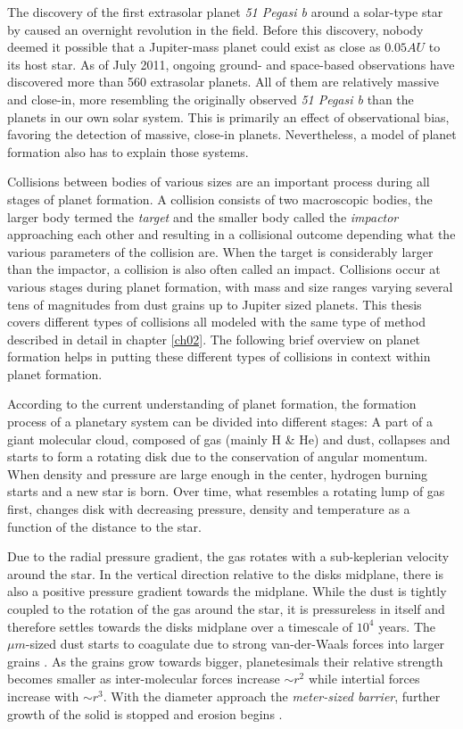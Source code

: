 The discovery of the first extrasolar planet \emph{51 Pegasi b} around a solar-type star by \cite{1995Natur.378..355M} caused an overnight revolution in the field. 
Before this discovery, nobody deemed it possible that a Jupiter-mass planet could exist as close as $0.05 AU$ to its host star. As of July 2011, ongoing ground- and space-based observations have discovered more than 560 extrasolar planets. All of them are relatively massive and close-in, more resembling the originally observed \emph{51 Pegasi b} than the planets in our own solar system. This is primarily an effect of observational bias, favoring the detection of massive, close-in planets. Nevertheless, a model of planet formation also has to explain those systems.

Collisions between bodies of various sizes are an important process during all stages of planet formation. A collision consists of two macroscopic bodies, the larger body termed the \emph{target} and the smaller body called the \emph{impactor} approaching each other and resulting in a collisional outcome depending what the various parameters of the collision are. When the target is considerably larger than the impactor, a collision is also often called an impact. Collisions occur at various stages during planet formation, with mass and size ranges varying several tens of magnitudes from dust grains up to Jupiter sized planets. This thesis covers different types of collisions all modeled with the same type of method described in detail in chapter \ref{ch02}. The following brief overview on planet formation helps in putting these different types of collisions in context within planet formation.

According to the current understanding of planet formation, the formation process of a planetary system can be divided into different stages: A part of a giant molecular cloud, composed of gas (mainly H \& He) and dust, collapses and starts to form a rotating disk due to the conservation of angular momentum. When density and pressure are large enough in the center, hydrogen burning starts and a new star is born. Over time, what resembles a rotating lump of gas first, changes disk with decreasing pressure, density and temperature as a function of the distance to the star.

Due to the radial pressure gradient, the gas rotates with a sub-keplerian velocity around the star. In the vertical direction relative to the disks midplane, there is also a positive pressure gradient towards the midplane. While the dust is tightly coupled to the rotation of the gas around the star, it is pressureless in itself and therefore settles towards the disks midplane over a timescale of $10^4$ years. The $\mu m$-sized dust starts to coagulate due to strong van-der-Waals forces into larger grains \citep{2010A&A...513A..56G}. As the grains grow towards bigger, planetesimals their relative strength becomes smaller as inter-molecular forces increase $\sim r^2$ while intertial forces increase with $\sim r^3$. With the diameter approach the \emph{meter-sized barrier}, further growth of the solid is stopped and erosion begins \cite{Benz1999Icar..142....5B}.

